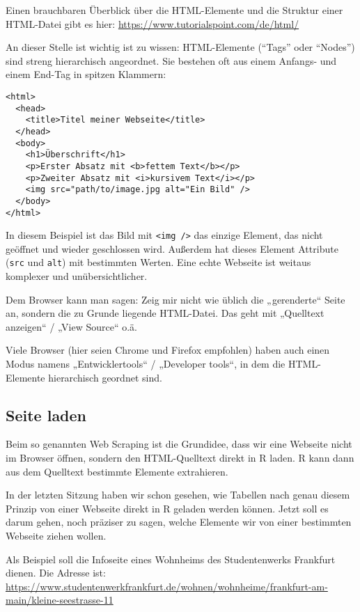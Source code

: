 \documentclass[
  ngerman,
]{article}
\begin{document}
Einen brauchbaren Überblick über die HTML-Elemente und die Struktur einer HTML-Datei gibt es hier: \url{https://www.tutorialspoint.com/de/html/}

An dieser Stelle ist wichtig ist zu wissen: HTML-Elemente (``Tags'' oder ``Nodes'') sind streng hierarchisch angeordnet. Sie bestehen oft aus einem Anfangs- und einem End-Tag in spitzen Klammern:

\begin{verbatim}
<html>
  <head>
    <title>Titel meiner Webseite</title>
  </head>
  <body>
    <h1>Überschrift</h1>
    <p>Erster Absatz mit <b>fettem Text</b></p>
    <p>Zweiter Absatz mit <i>kursivem Text</i></p>
    <img src="path/to/image.jpg alt="Ein Bild" />
  </body>
</html>
\end{verbatim}

In diesem Beispiel ist das Bild mit \texttt{\textless{}img\ /\textgreater{}} das einzige Element, das nicht geöffnet und wieder geschlossen wird. Außerdem hat dieses Element Attribute (\texttt{src} und \texttt{alt}) mit bestimmten Werten. Eine echte Webseite ist weitaus komplexer und unübersichtlicher.

Dem Browser kann man sagen: Zeig mir nicht wie üblich die „gerenderte`` Seite an, sondern die zu Grunde liegende HTML-Datei. Das geht mit „Quelltext anzeigen`` / „View Source`` o.ä.

Viele Browser (hier seien Chrome und Firefox empfohlen) haben auch einen Modus namens „Entwicklertools`` / „Developer tools``, in dem die HTML-Elemente hierarchisch geordnet sind.

\hypertarget{seite-laden}{%
\subsection{Seite laden}\label{seite-laden}}

Beim so genannten Web Scraping ist die Grundidee, dass wir eine Webseite nicht im Browser öffnen, sondern den HTML-Quelltext direkt in R laden. R kann dann aus dem Quelltext bestimmte Elemente extrahieren.

In der letzten Sitzung haben wir schon gesehen, wie Tabellen nach genau diesem Prinzip von einer Webseite direkt in R geladen werden können. Jetzt soll es darum gehen, noch präziser zu sagen, welche Elemente wir von einer bestimmten Webseite ziehen wollen.

Als Beispiel soll die Infoseite eines Wohnheims des Studentenwerks Frankfurt dienen. Die Adresse ist: \url{https://www.studentenwerkfrankfurt.de/wohnen/wohnheime/frankfurt-am-main/kleine-seestrasse-11}
\end{document}
